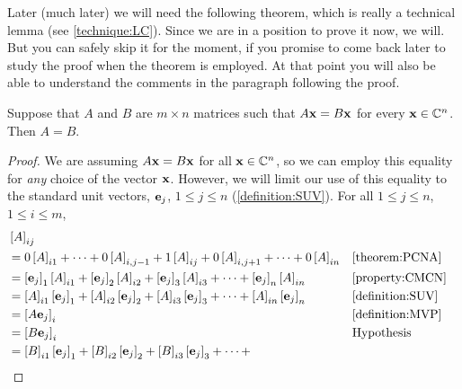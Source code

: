 \documentclass{ximera}
\begin{document}
Later (much later) we will need the following theorem, which is really
a technical lemma (see \ref{technique:LC}).  Since we are in a
position to prove it now, we will.  But you can safely skip it for the
moment, if you promise to come back later to study the proof when the
theorem is employed.  At that point you will also be able to
understand the comments in the paragraph following the proof.

\begin{theorem}
  \label{theorem:EMMVP}
  
  Suppose that $A$ and $B$ are $m\times n$ matrices such that
  $A\mathbf{x}=B\mathbf{x}$ for every $\mathbf{x}\in\mathbb{C}^{n}$.  Then $A=B$.
  
  \begin{proof}
    We are assuming $A\mathbf{x}=B\mathbf{x}$ for all $\mathbf{x}\in\mathbb{C}^{n}$, so we can employ this equality for \textit{any} choice of the vector $\mathbf{x}$.  However, we will limit our use of this equality to the standard unit vectors, $\mathbf{e}_j$, $1\leq j\leq n$ (\ref{definition:SUV}).  For all $1\leq j\leq n$, $1\leq i\leq m$,
    \begin{align*}
      &\matrixentry{A}{ij}\\
      &=
        0\matrixentry{A}{i1}+
        \cdots+
        0\matrixentry{A}{i,j-1}+
        1\matrixentry{A}{ij}+
        0\matrixentry{A}{i,j+1}+
        \cdots+
        0\matrixentry{A}{in}
      &&\ref{theorem:PCNA}\\
      &=
        \vectorentry{\vect{e}_j}{1}\matrixentry{A}{i1}+
        \vectorentry{\vect{e}_j}{2}\matrixentry{A}{i2}+
        \vectorentry{\vect{e}_j}{3}\matrixentry{A}{i3}+
        \cdots+
        \vectorentry{\vect{e}_j}{n}\matrixentry{A}{in}
      &&\ref{property:CMCN}\\
      &=
        \matrixentry{A}{i1}\vectorentry{\vect{e}_j}{1}+
        \matrixentry{A}{i2}\vectorentry{\vect{e}_j}{2}+
        \matrixentry{A}{i3}\vectorentry{\vect{e}_j}{3}+
        \cdots+
        \matrixentry{A}{in}\vectorentry{\vect{e}_j}{n}
      &&\ref{definition:SUV}\\
      &=
        \vectorentry{A\vect{e}_j}{i}&&\ref{definition:MVP}\\
      &=
        \vectorentry{B\vect{e}_j}{i}&&\text{Hypothesis}\\
      &=
        \matrixentry{B}{i1}\vectorentry{\vect{e}_j}{1}+
        \matrixentry{B}{i2}\vectorentry{\vect{e}_j}{2}+
        \matrixentry{B}{i3}\vectorentry{\vect{e}_j}{3}+
        \cdots+

\end{align*}
\end{proof}
\end{theorem}
\end{document}

